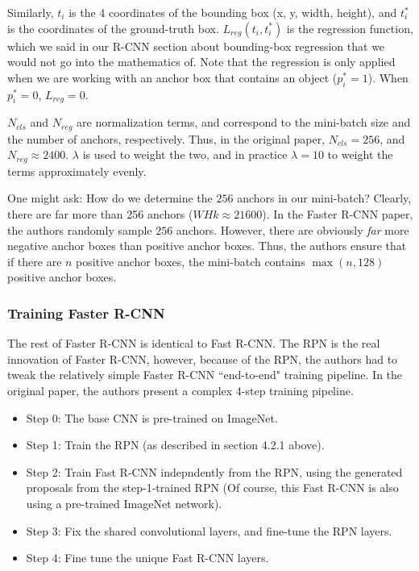 \documentclass{article}
\begin{document}
Similarly, $t_i$ is the 4 coordinates of the bounding box (x, y, width, height), and $t_i^*$ is the coordinates of the ground-truth box. $L_{reg}(t_i,t_i^*)$ is the regression function, which we said in our R-CNN section about bounding-box regression that we would not go into the mathematics of. Note that the regression is only applied when we are working with an anchor box that contains an object ($p_i^*=1$). When $p_i^*=0$, $L_{reg}=0$.

$N_{cls}$ and $N_{reg}$ are normalization terms, and correspond to the mini-batch size and the number of anchors, respectively. Thus, in the original paper, $N_{cls} = 256$, and $N_{reg} \approx 2400$. $\lambda$ is used to weight the two, and in practice $\lambda=10$ to weight the terms approximately evenly.


One might ask: How do we determine the $256$ anchors in our mini-batch? Clearly, there are far more than 256 anchors ($WHk \approx 21600$). In the Faster R-CNN paper, the authors randomly sample $256$ anchors. However, there are obviously \textit{far} more negative anchor boxes than positive anchor boxes. Thus, the authors ensure that if there are $n$ positive anchor boxes, the mini-batch contains $\max(n, 128)$ positive anchor boxes. 

\subsubsection{Training Faster R-CNN}
The rest of Faster R-CNN is identical to Fast R-CNN. The RPN is the real innovation of Faster R-CNN, however, because of the RPN, the authors had to tweak the relatively simple Faster R-CNN ``end-to-end" training pipeline. In the original paper, the authors present a complex 4-step training pipeline. 

\begin{itemize}
    \item Step 0: The base CNN is pre-trained on ImageNet.
    \item Step 1: Train the RPN (as described in section 4.2.1 above).
    \item Step 2: Train Fast R-CNN indepndently from the RPN, using the generated proposals from the step-1-trained RPN (Of course, this Fast R-CNN is also using a pre-trained ImageNet network).
    \item Step 3: Fix the shared convolutional layers, and fine-tune the RPN layers. 
    \item Step 4: Fine tune the unique Fast R-CNN layers.
\end{itemize}
\end{document}
